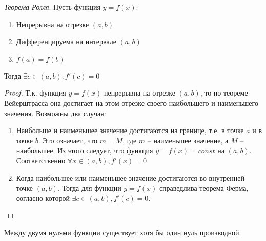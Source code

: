 \begin{theorem}
    \textit{Теорема Ролля}.
    Пусть функция $y = f(x)$:
     \begin{enumerate}
      \item Непрерывна на отрезке $(a, b)$ 
      \item Дифференцируема на интервале  $(a, b)$
      \item $f(a) = f(b)$
    \end{enumerate}
    Тогда $\exists c \in (a, b) : f'(c) = 0$
\end{theorem}
\begin{proof}
  Т.к. функция $y = f(x)$ непрерывна на отрезке $(a,b)$, то по теореме Вейерштрасса она достигает на этом отрезке своего наибольшего и наименьшего значения. Возможны два случая:
  \begin{enumerate}
    \item Наибольше и наименьшее значение достигаются на границе, т.е. в точке $a$ и в точке  $b$. Это означает, что  $m = M$, где  $m$ -- наименьшее значение, а  $M$ -- наибольшее. Из этого следует, что функция  $y = f(x) = const$ на $(a, b)$. Соответственно  $\forall x \in (a, b), f'(x) = 0$
    \item Когда наибольшее или наименьшее значение достигаются во внутренней точке $(a, b)$. Тогда для функции $y = f(x)$ справедлива теорема Ферма, согласно которой $\exists c \in (a, b), f'(c) = 0$.
  \end{enumerate}
\end{proof}
\begin{corollary}
  Между двумя нулями функции существует хотя бы один нуль производной.
\end{corollary}

